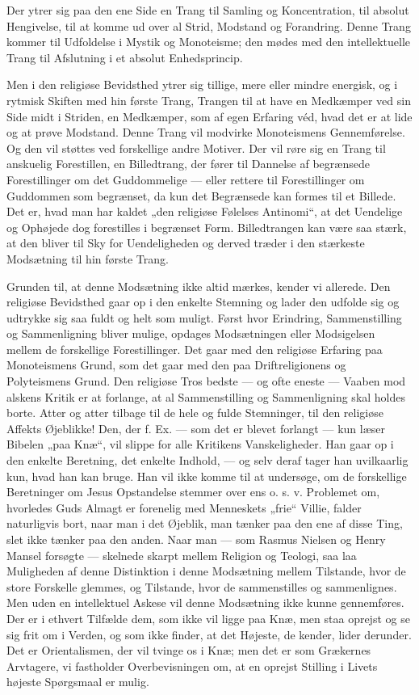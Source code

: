 \documentclass[12pt,a4paper,openany]{book}
\newcommand{\opage}[1]{\marginnote{\footnotesize\textit{[#1]}}}
\begin{document}
Der ytrer sig paa den ene Side en Trang til Samling og Koncentration,
til absolut Hengivelse, til at komme ud over al Strid, Modstand og
Forandring. Denne Trang kommer til Udfoldelse i Mystik og Monoteisme;
den mødes med den intellektuelle Trang til Afslutning i et absolut
Enhedsprincip.

Men i den religiøse Bevidsthed ytrer sig tillige, mere eller mindre
energisk, og i rytmisk Skiften med hin første Trang, Trangen til at have
en Medkæmper ved sin Side midt i Striden, en Medkæmper, som af egen
Erfaring véd, hvad det er at lide og at prøve Modstand. Denne Trang vil
modvirke Monoteismens Gennemførelse. Og den vil støttes ved forskellige
andre Motiver. Der vil røre sig en Trang til anskuelig Forestillen, en
Billedtrang, der fører til Dannelse af begrænsede Forestillinger om det
Guddommelige --- eller rettere til Forestillinger om Guddommen som
begrænset, da kun det Begrænsede kan formes til et Billede. Det er, hvad
man har kaldet „den religiøse Følelses Antinomi“, at det Uendelige og
Ophøjede dog forestilles i begrænset Form. Billedtrangen kan være saa
stærk, at den bliver til Sky for Uendeligheden og derved træder i den
stærkeste Modsætning til hin første Trang.

Grunden til, at denne Modsætning ikke altid mærkes, kender vi allerede.
Den religiøse Bevidsthed gaar op i den enkelte Stemning og lader den
udfolde sig og udtrykke sig saa fuldt og helt som muligt. Først hvor
Erindring, Sammenstilling og Sammenligning bliver mulige, opdages
Modsætningen eller Modsigelsen mellem de forskellige Forestillinger. Det
gaar med den religiøse Erfaring paa Monoteismens Grund, som det gaar med
den paa Driftreligionens og Polyteismens Grund. Den religiøse Tros
bedste --- og ofte eneste --- Vaaben mod alskens Kritik er at forlange,
at al Sammenstilling og Sammenligning skal holdes borte. Atter og atter
tilbage til de hele og fulde Stemninger, til den religiøse Affekts
Øjeblikke! Den, der f. Ex. --- som det er blevet forlangt --- kun læser
Bibelen „paa Knæ“, vil slippe for alle Kritikens Vanskeligheder. Han
gaar op i den enkelte Beretning, det enkelte Indhold, --- og selv deraf
tager han uvilkaarlig kun, hvad han kan bruge. Han vil ikke komme til at
undersøge, om de forskellige Beretninger om Jesus Opstandelse stemmer
over%
\opage{107}ens o. s. v. Problemet om, hvorledes Guds Almagt er forenelig
med Menneskets „frie“ Villie, falder naturligvis bort, naar man i det
Øjeblik, man tænker paa den ene af disse Ting, slet ikke tænker paa den
anden. Naar man --- som Rasmus Nielsen og Henry Mansel forsøgte ---
skelnede skarpt mellem Religion og Teologi, saa laa Muligheden af denne
Distinktion i denne Modsætning mellem Tilstande, hvor de store Forskelle
glemmes, og Tilstande, hvor de sammenstilles og sammenlignes. Men uden
en intellektuel Askese vil denne Modsætning ikke kunne gennemføres. Der
er i ethvert Tilfælde dem, som ikke vil ligge paa Knæ, men staa oprejst
og se sig frit om i Verden, og som ikke finder, at det Højeste, de
kender, lider derunder. Det er Orientalismen, der vil tvinge os i Knæ;
men det er som Grækernes Arvtagere, vi fastholder Overbevisningen om, at
en oprejst Stilling i Livets højeste Spørgsmaal er mulig.
\end{document}

